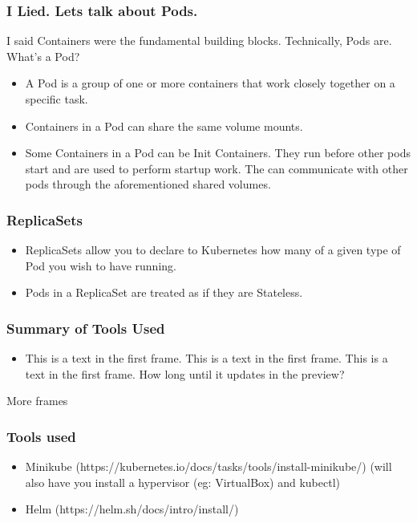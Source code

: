 \documentclass{beamer}
\begin{document}
\begin{frame}
\frametitle{I Lied. Lets talk about Pods.}
I said Containers were the fundamental building blocks. Technically, Pods are. What's a Pod?
\begin{itemize}
    \item A Pod is a group of one or more containers that work closely together on a specific task.
    \item Containers in a Pod can share the same volume mounts.
    \item Some Containers in a Pod can be Init Containers. They run before other pods start and are used to perform startup work. The can communicate with other pods through the aforementioned shared volumes.
\end{itemize}
\end{frame}

\begin{frame}
\frametitle{ReplicaSets}
\begin{itemize}    
    \item ReplicaSets allow you to declare to Kubernetes how many of a given type of Pod you wish to have running.
    \item Pods in a ReplicaSet are treated as if they are Stateless.
\end{itemize}
\end{frame}


\begin{frame}
\frametitle{Summary of Tools Used}
\begin{itemize}
    \item This is a text in the first frame. This is a text in the first frame. This is a text in the first frame. How long until it updates in the preview?
\end{itemize}
\end{frame}

\begin{frame}
More frames
\end{frame}

\begin{frame}
\frametitle{Tools used}
\begin{itemize}
    \item Minikube (https://kubernetes.io/docs/tasks/tools/install-minikube/)
(will also have you install a hypervisor (eg: VirtualBox) and kubectl)
    \item Helm (https://helm.sh/docs/intro/install/)
\end{itemize}
\end{frame}
\end{document}
